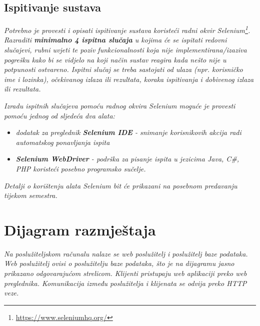 			
			
			\subsection{Ispitivanje sustava}
			
			 \textit{Potrebno je provesti i opisati ispitivanje sustava koristeći radni okvir Selenium\footnote{\url{https://www.seleniumhq.org/}}. Razraditi \textbf{minimalno 4 ispitna slučaja} u kojima će se ispitati redovni slučajevi, rubni uvjeti te poziv funkcionalnosti koja nije implementirana/izaziva pogrešku kako bi se vidjelo na koji način sustav reagira kada nešto nije u potpunosti ostvareno. Ispitni slučaj se treba sastojati od ulaza (npr. korisničko ime i lozinka), očekivanog izlaza ili rezultata, koraka ispitivanja i dobivenog izlaza ili rezultata.\\ }
			 
			 \textit{Izradu ispitnih slučajeva pomoću radnog okvira Selenium moguće je provesti pomoću jednog od sljedeća dva alata:}
			 \begin{itemize}
			 	\item \textit{dodatak za preglednik \textbf{Selenium IDE} - snimanje korisnikovih akcija radi automatskog ponavljanja ispita	}
			 	\item \textit{\textbf{Selenium WebDriver} - podrška za pisanje ispita u jezicima Java, C\#, PHP koristeći posebno programsko sučelje.}
			 \end{itemize}
		 	\textit{Detalji o korištenju alata Selenium bit će prikazani na posebnom predavanju tijekom semestra.}
			
			\eject 
		
		
		\section{Dijagram razmještaja}
			
			
			 \textit{Na poslužiteljskom računalu nalaze se web poslužitelj i poslužitelj baze podataka. Web poslužitelj ovisi o poslužitelju baze podataka, što je na dijagramu jasno prikazano odgovarajućom strelicom. Klijenti pristupaju web aplikaciji preko web preglednika. Komunikacija između poslužitelja i klijenata se odvija preko HTTP veze.}
			
